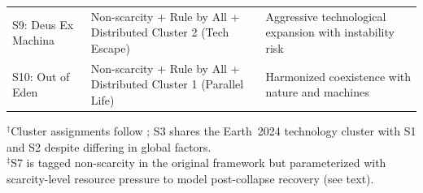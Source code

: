 \begin{table}[htbp]
{\begin{tabular}{l p{4.5cm} p{5.5cm}}
S9: Deus Ex Machina &
Non-scarcity + Rule by All + Distributed \newline Cluster 2 (Tech Escape) &
Aggressive technological expansion with instability risk \\

S10: Out of Eden &
Non-scarcity + Rule by All + Distributed \newline Cluster 1 (Parallel Life) &
Harmonized coexistence with nature and machines \\
\bottomrule
\end{tabular}
}

\smallskip
{\footnotesize $^{\dagger}$Cluster assignments follow \citet{Haqq-Misra2025-rt}; S3 shares the Earth~2024 technology cluster with S1 and S2 despite differing in global factors.\\
$^{\ddagger}$S7 is tagged non-scarcity in the original framework but parameterized with scarcity-level resource pressure to model post-collapse recovery (see text).}
\end{table}





